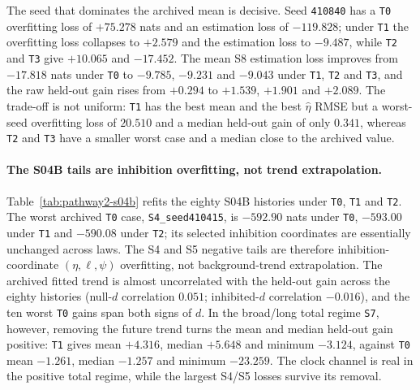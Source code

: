 The seed that dominates the archived mean is decisive. Seed \texttt{410840} has a \texttt{T0} overfitting loss of $+75.278$ nats and an estimation loss of $-119.828$; under \texttt{T1} the overfitting loss collapses to $+2.579$ and the estimation loss to $-9.487$, while \texttt{T2} and \texttt{T3} give $+10.065$ and $-17.452$. The mean S8 estimation loss improves from $-17.818$ nats under \texttt{T0} to $-9.785$, $-9.231$ and $-9.043$ under \texttt{T1}, \texttt{T2} and \texttt{T3}, and the raw held-out gain rises from $+0.294$ to $+1.539$, $+1.901$ and $+2.089$. The trade-off is not uniform: \texttt{T1} has the best mean and the best $\hat\eta$ RMSE but a worst-seed overfitting loss of $20.510$ and a median held-out gain of only $0.341$, whereas \texttt{T2} and \texttt{T3} have a smaller worst case and a median close to the archived value.

\paragraph{The S04B tails are inhibition overfitting, not trend extrapolation.}
Table~\ref{tab:pathway2-s04b} refits the eighty S04B histories under \texttt{T0}, \texttt{T1} and \texttt{T2}. The worst archived \texttt{T0} case, \texttt{S4\_seed410415}, is $-592.90$ nats under \texttt{T0}, $-593.00$ under \texttt{T1} and $-590.08$ under \texttt{T2}; its selected inhibition coordinates are essentially unchanged across laws. The S4 and S5 negative tails are therefore inhibition-coordinate $(\eta,\ell,\psi)$ overfitting, not background-trend extrapolation. The archived fitted trend is almost uncorrelated with the held-out gain across the eighty histories (null-$d$ correlation $0.051$; inhibited-$d$ correlation $-0.016$), and the ten worst \texttt{T0} gains span both signs of $d$. In the broad/long total regime \texttt{S7}, however, removing the future trend turns the mean and median held-out gain positive: \texttt{T1} gives mean $+4.316$, median $+5.648$ and minimum $-3.124$, against \texttt{T0} mean $-1.261$, median $-1.257$ and minimum $-23.259$. The clock channel is real in the positive total regime, while the largest S4/S5 losses survive its removal.

